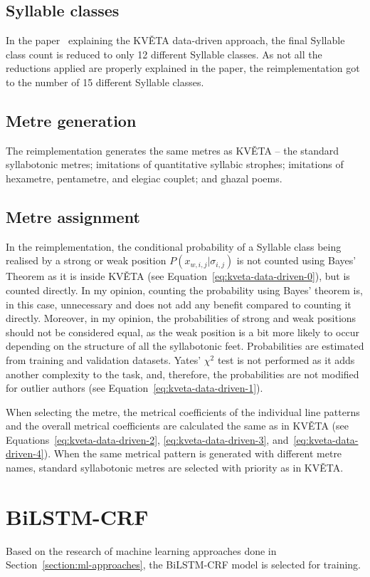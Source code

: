 \subsection{Syllable classes}
In the paper~\cite{KVETA} explaining the KVĚTA data-driven approach, the final Syllable class count is reduced to only 12 different Syllable classes. As not all the reductions applied are properly explained in the paper, the reimplementation got to the number of 15 different Syllable classes.

\subsection{Metre generation}
The reimplementation generates the same metres as KVĚTA -- the standard syllabotonic metres; imitations of quantitative syllabic strophes; imitations of hexametre, pentametre, and elegiac couplet; and ghazal poems.

\subsection{Metre assignment}
In the reimplementation, the conditional probability of a Syllable class being realised by a strong or weak position $P(x_{w,i,j}|\sigma_{i,j})$ is not counted using Bayes' Theorem as it is inside KVĚTA (see Equation~\eqref{eq:kveta-data-driven-0}), but is counted directly. In my opinion, counting the probability using Bayes' theorem is, in this case, unnecessary and does not add any benefit compared to counting it directly. Moreover, in my opinion, the probabilities of strong and weak positions should not be considered equal, as the weak position is a bit more likely to occur depending on the structure of all the syllabotonic feet. Probabilities are estimated from training and validation datasets. Yates' $\chi^2$ test is not performed as it adds another complexity to the task, and, therefore, the probabilities are not modified for outlier authors (see Equation~\eqref{eq:kveta-data-driven-1}).

When selecting the metre, the metrical coefficients of the individual line patterns and the overall metrical coefficients are calculated the same as in KVĚTA (see Equations~\eqref{eq:kveta-data-driven-2}, \eqref{eq:kveta-data-driven-3}, and~\eqref{eq:kveta-data-driven-4}). When the same metrical pattern is generated with different metre names, standard syllabotonic metres are selected with priority as in KVĚTA.

\section{BiLSTM-CRF}
Based on the research of machine learning approaches done in Section~\ref{section:ml-approaches}, the BiLSTM-CRF model is selected for training.
 
